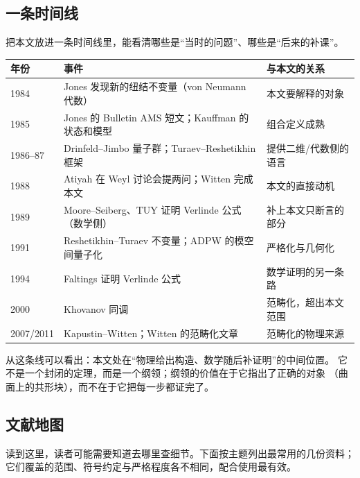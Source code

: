 \subsection{一条时间线}

把本文放进一条时间线里，能看清哪些是“当时的问题”、哪些是“后来的补课”。

\begin{center}
\small
\begin{tabular}{@{}p{1.9cm}p{7.4cm}p{4.6cm}@{}}
\toprule
年份 & 事件 & 与本文的关系 \\
\midrule
1984 & Jones 发现新的纽结不变量（von Neumann 代数） & 本文要解释的对象 \\
1985 & Jones 的 Bulletin AMS 短文；Kauffman 的状态和模型 & 组合定义成熟 \\
1986–87 & Drinfeld–Jimbo 量子群；Turaev–Reshetikhin 框架 & 提供二维/代数侧的语言 \\
1988 & Atiyah 在 Weyl 讨论会提两问；Witten 完成本文 & 本文的直接动机 \\
1989 & Moore–Seiberg、TUY 证明 Verlinde 公式（数学侧） & 补上本文只断言的部分 \\
1991 & Reshetikhin–Turaev 不变量；ADPW 的模空间量子化 & 严格化与几何化 \\
1994 & Faltings 证明 Verlinde 公式 & 数学证明的另一条路 \\
2000 & Khovanov 同调 & 范畴化，超出本文范围 \\
2007/2011 & Kapustin–Witten；Witten 的范畴化文章 & 范畴化的物理来源 \\
\bottomrule
\end{tabular}
\end{center}

\noindent 从这条线可以看出：本文处在“物理给出构造、数学随后补证明”的中间位置。
它不是一个封闭的定理，而是一个纲领；纲领的价值在于它指出了正确的对象
（曲面上的共形块），而不在于它把每一步都证完了。

\subsection{文献地图}

读到这里，读者可能需要知道去哪里查细节。下面按主题列出最常用的几份资料；
它们覆盖的范围、符号约定与严格程度各不相同，配合使用最有效。

